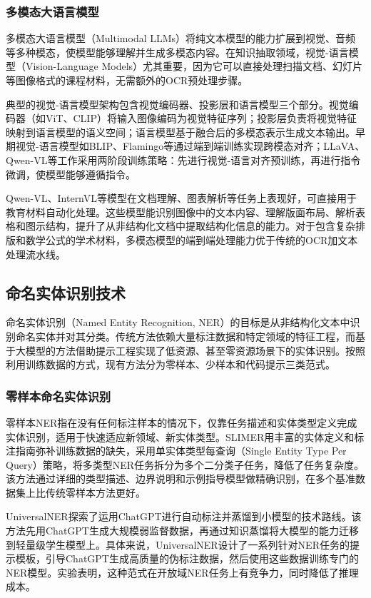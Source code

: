 \subsubsection{多模态大语言模型}

多模态大语言模型（Multimodal LLMs）将纯文本模型的能力扩展到视觉、音频等多种模态，使模型能够理解并生成多模态内容。在知识抽取领域，视觉-语言模型（Vision-Language Models）尤其重要，因为它可以直接处理扫描文档、幻灯片等图像格式的课程材料，无需额外的OCR预处理步骤。

典型的视觉-语言模型架构包含视觉编码器、投影层和语言模型三个部分。视觉编码器（如ViT、CLIP）将输入图像编码为视觉特征序列；投影层负责将视觉特征映射到语言模型的语义空间；语言模型基于融合后的多模态表示生成文本输出。早期视觉-语言模型如BLIP、Flamingo等通过端到端训练实现跨模态对齐；LLaVA、Qwen-VL等工作采用两阶段训练策略：先进行视觉-语言对齐预训练，再进行指令微调，使模型能够遵循指令。

Qwen-VL、InternVL等模型在文档理解、图表解析等任务上表现好，可直接用于教育材料自动化处理。这些模型能识别图像中的文本内容、理解版面布局、解析表格和图示结构，提升了从非结构化文档中提取结构化信息的能力。对于包含复杂排版和数学公式的学术材料，多模态模型的端到端处理能力优于传统的OCR加文本处理流水线。

\subsection{命名实体识别技术}

命名实体识别（Named Entity Recognition, NER）的目标是从非结构化文本中识别命名实体并对其分类。传统方法依赖大量标注数据和特定领域的特征工程，而基于大模型的方法借助提示工程实现了低资源、甚至零资源场景下的实体识别。按照利用训练数据的方式，现有方法分为零样本、少样本和代码提示三类范式\cite{chewanxiang2021}。

\subsubsection{零样本命名实体识别}

零样本NER指在没有任何标注样本的情况下，仅靠任务描述和实体类型定义完成实体识别，适用于快速适应新领域、新实体类型。SLIMER\cite{slimer_2024}用丰富的实体定义和标注指南弥补训练数据的缺失，采用单实体类型每查询（Single Entity Type Per Query）策略，将多类型NER任务拆分为多个二分类子任务，降低了任务复杂度。该方法通过详细的类型描述、边界说明和示例指导模型做精确识别，在多个基准数据集上比传统零样本方法更好。

UniversalNER探索了运用ChatGPT进行自动标注并蒸馏到小模型的技术路线\cite{universalner_2023}。该方法先用ChatGPT生成大规模弱监督数据，再通过知识蒸馏将大模型的能力迁移到轻量级学生模型上。具体来说，UniversalNER设计了一系列针对NER任务的提示模板，引导ChatGPT生成高质量的伪标注数据，然后使用这些数据训练专门的NER模型。实验表明，这种范式在开放域NER任务上有竞争力，同时降低了推理成本。

